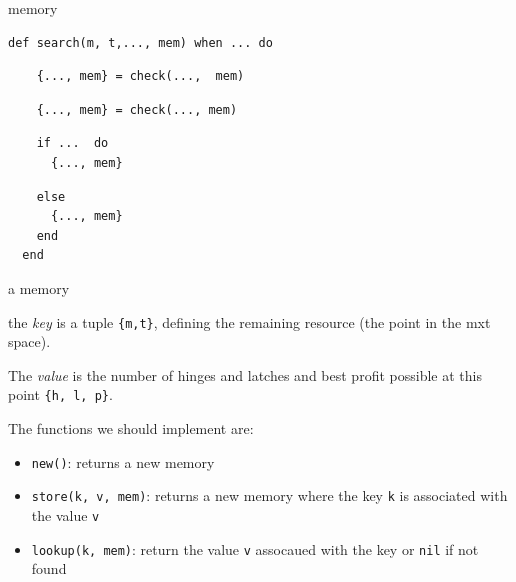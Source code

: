 \begin{frame}[fragile]{memory}

\begin{verbatim}
def search(m, t,..., mem) when ... do
\end{verbatim}
\pause
\begin{verbatim}
    {..., mem} = check(...,  mem)
\end{verbatim}
\pause
\begin{verbatim}
    {..., mem} = check(..., mem)
\end{verbatim}
\pause
\begin{verbatim}
    if ...  do
      {..., mem}
\end{verbatim}
\pause
\begin{verbatim}
    else
      {..., mem}
    end
  end
\end{verbatim}

\end{frame}

\begin{frame}[fragile]{a memory}

\vspace{10pt}\pause

the {\em key} is a tuple \texttt{\{m,t\}}, defining the remaining resource (the point in the mxt space).

\vspace{10pt}\pause

The {\em value} is the number of hinges and latches and best profit possible at this point \texttt{\{h, l, p\}}.

\vspace{10pt}\pause

The functions we should implement are: \pause

\begin{itemize}

  \item \texttt{new()}: returns a new memory \pause

  \item \texttt{store(k, v, mem)}: returns a new memory where the key
  \texttt{k} is associated with the value \texttt{v} \pause

  \item \texttt{lookup(k, mem)}: return the value \texttt{v} assocaued with
  the key or \texttt{nil} if not found
\end{itemize}

\end{frame}



